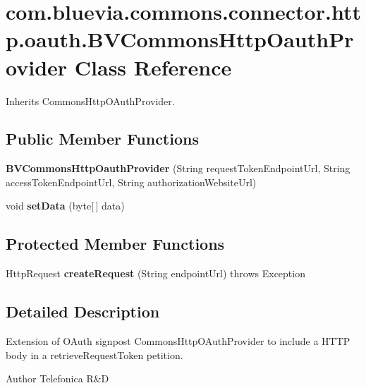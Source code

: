 \hypertarget{classcom_1_1bluevia_1_1commons_1_1connector_1_1http_1_1oauth_1_1BVCommonsHttpOauthProvider}{
\section{com.bluevia.commons.connector.http.oauth.BVCommonsHttpOauthProvider Class Reference}
\label{classcom_1_1bluevia_1_1commons_1_1connector_1_1http_1_1oauth_1_1BVCommonsHttpOauthProvider}
}


Inherits CommonsHttpOAuthProvider.

\subsection*{Public Member Functions}
\begin{DoxyCompactItemize}
\item 
\hypertarget{classcom_1_1bluevia_1_1commons_1_1connector_1_1http_1_1oauth_1_1BVCommonsHttpOauthProvider_a5d59d31e2c1fe17d834239d23f39245c}{
{\bfseries BVCommonsHttpOauthProvider} (String requestTokenEndpointUrl, String accessTokenEndpointUrl, String authorizationWebsiteUrl)}
\label{classcom_1_1bluevia_1_1commons_1_1connector_1_1http_1_1oauth_1_1BVCommonsHttpOauthProvider_a5d59d31e2c1fe17d834239d23f39245c}

\item 
\hypertarget{classcom_1_1bluevia_1_1commons_1_1connector_1_1http_1_1oauth_1_1BVCommonsHttpOauthProvider_a18ac7ae4b45d5f15ddb7926e39c32ca1}{
void {\bfseries setData} (byte\mbox{[}$\,$\mbox{]} data)}
\label{classcom_1_1bluevia_1_1commons_1_1connector_1_1http_1_1oauth_1_1BVCommonsHttpOauthProvider_a18ac7ae4b45d5f15ddb7926e39c32ca1}

\end{DoxyCompactItemize}
\subsection*{Protected Member Functions}
\begin{DoxyCompactItemize}
\item 
\hypertarget{classcom_1_1bluevia_1_1commons_1_1connector_1_1http_1_1oauth_1_1BVCommonsHttpOauthProvider_aa1d44c7fac5eaad594b3ac1b6d83dd2a}{
HttpRequest {\bfseries createRequest} (String endpointUrl)  throws Exception }
\label{classcom_1_1bluevia_1_1commons_1_1connector_1_1http_1_1oauth_1_1BVCommonsHttpOauthProvider_aa1d44c7fac5eaad594b3ac1b6d83dd2a}

\end{DoxyCompactItemize}


\subsection{Detailed Description}
Extension of OAuth signpost CommonsHttpOAuthProvider to include a HTTP body in a retrieveRequestToken petition.

\begin{DoxyAuthor}{Author}
Telefonica R\&D 
\end{DoxyAuthor}

